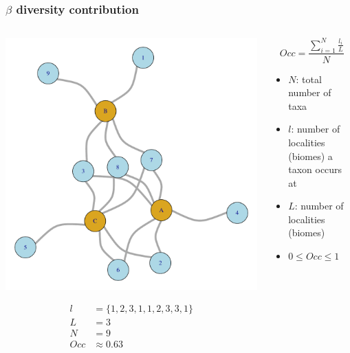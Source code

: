 \documentclass{beamer}
\begin{document}
\begin{frame}
  \frametitle{\(\beta\) diversity contribution}

  \begin{columns}
    \begin{column}{0.6\textwidth}
      \begin{center}
        \includegraphics[height = 0.5\textheight, width = \textwidth, keepaspectratio = true]{figure/sim_graph}

        \begin{align*}
          l &= \{1, 2, 3, 1, 1, 2, 3, 3, 1\}\\
          L &= 3\\
          N &= 9\\
          Occ &\approx 0.63 
        \end{align*}
      \end{center}
    \end{column}
    \begin{column}{0.4\textwidth}
      \[
        Occ = \frac{\sum_{i = 1}^{N} \frac{l_{i}}{L}}{N}
      \]

      \begin{itemize}
        \item \(N\): total number of taxa
        \item \(l\): number of localities (biomes) a taxon occurs at
        \item \(L\): number of localities (biomes)
        \item \(0 \leq Occ \leq 1\)
      \end{itemize}
    \end{column}
  \end{columns}
\end{frame}
\end{document}
